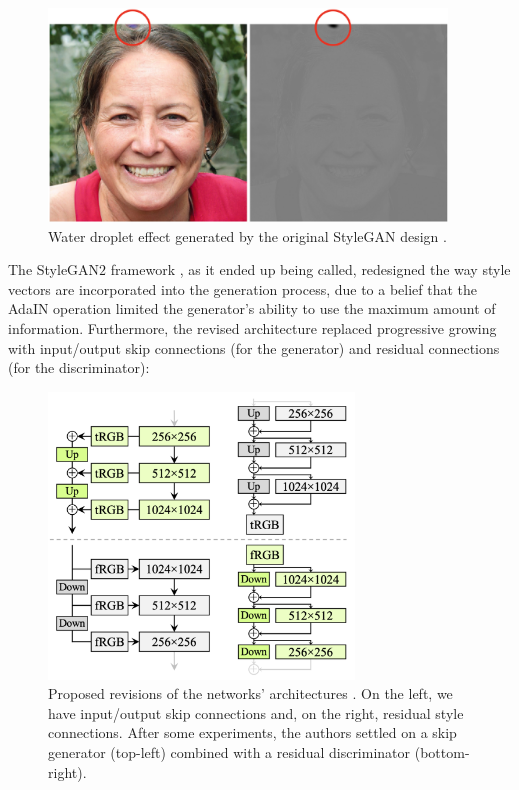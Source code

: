 \begin{figure}[h]
\centering
\includegraphics[width=300pt]{figures/figure_12.pdf}
\caption{Water droplet effect generated by the original Style\ac{GAN} design \cite{stylegan}.}
\label{fig:stylegan}
\end{figure}

The Style\ac{GAN}$2$ framework \cite{stylegan2}, as it ended up being called, redesigned the way style vectors are incorporated into the generation process, due to a belief that the \ac{AdaIN} operation limited the generator's ability to use the maximum amount of information. Furthermore, the revised architecture replaced progressive growing with input/output skip connections (for the generator) and residual connections (for the discriminator):\\

\begin{figure}[h]
\centering
\includegraphics[width=230pt]{figures/figure_13.pdf}
\caption{Proposed revisions of the networks' architectures \cite{stylegan2}. On the left, we have input/output skip connections and, on the right, residual style connections. After some experiments, the authors settled on a skip generator (top-left) combined with a residual discriminator (bottom-right).}
\label{fig:stylegan_2}
\end{figure}

